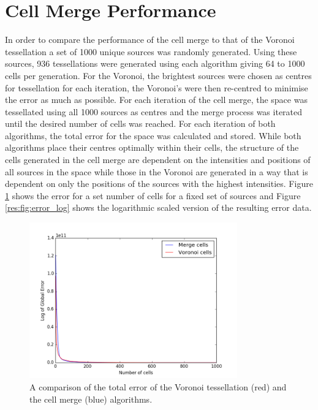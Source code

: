 \section{Cell Merge Performance}
In order to compare the performance of the cell merge to that of the Voronoi tessellation a set of 1000 unique sources was randomly generated. Using these sources, 936 tessellations were generated using each algorithm giving 64 to 1000 cells per generation. For the Voronoi, the brightest sources were chosen as centres for tessellation for each iteration, the Voronoi's were then re-centred to minimise the error as much as possible. For each iteration of the cell merge, the space was tessellated using all 1000 sources as centres and the merge process was iterated until the desired number of cells was reached. For each iteration of both algorithms, the total error for the space was calculated and stored. While both algorithms place their centres optimally within their cells, the structure of the cells generated in the cell merge are dependent on the intensities and positions of all sources in the space while those in the Voronoi are generated in a way that is dependent on only the positions of the sources with the highest intensities. Figure \ref{res:fig:error} shows the error for a set number of cells for a fixed set of sources and Figure \ref{res:fig:error_log} shows the logarithmic scaled version of the resulting error data.
\begin{figure}[H]
\centering
\includegraphics[width=0.8\textwidth]{Images/result_error.png}
\caption{A comparison of the total error of the Voronoi tessellation (red) and the cell merge (blue) algorithms.}
\label{res:fig:error}
\end{figure}
